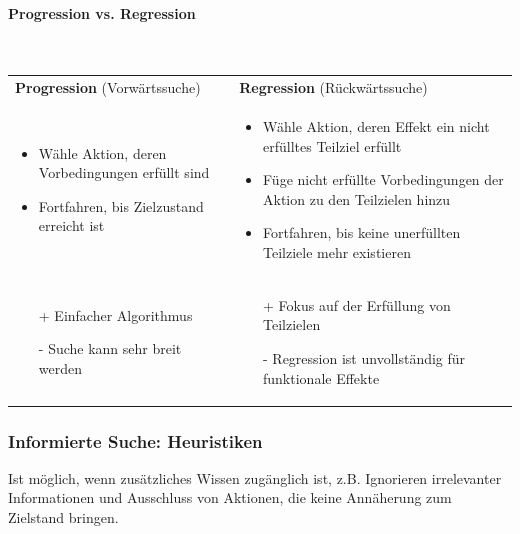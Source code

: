 \paragraph*{Progression vs. Regression} \mbox{}
\vspace{1em} \\
\begin{tabular}{p{} p{}}
\textbf{Progression} (Vorwärtssuche) & \textbf{Regression} (Rückwärtssuche) \\
\begin{itemize}
	\item Wähle Aktion, deren Vorbedingungen erfüllt sind
	\item Fortfahren, bis Zielzustand erreicht ist
\end{itemize}
&
\begin{itemize}
	\item Wähle Aktion, deren Effekt ein nicht erfülltes Teilziel erfüllt
	\item Füge nicht erfüllte Vorbedingungen der Aktion zu den Teilzielen hinzu
	\item Fortfahren, bis keine unerfüllten Teilziele mehr existieren
\end{itemize}
\\
\begin{itemize}
	\item[+] Einfacher Algorithmus
	\item[-] Suche kann sehr breit werden
\end{itemize}
&
\begin{itemize}
	\item[+] Fokus auf der Erfüllung von Teilzielen
	\item[-] Regression ist unvollständig für funktionale Effekte
\end{itemize}
\end{tabular}


\subsubsection{Informierte Suche: Heuristiken}
Ist möglich, wenn zusätzliches Wissen zugänglich ist, z.B.
Ignorieren irrelevanter Informationen und Ausschluss von Aktionen, die keine Annäherung zum Zielstand bringen.


